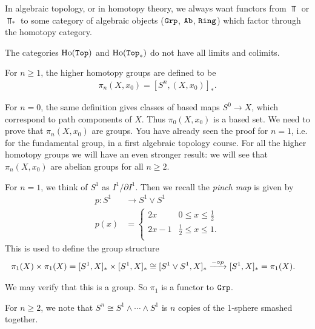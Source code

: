 \documentclass{article}[11pt]
\newcommand{\smashprod}{\wedge} %
\begin{document}
In algebraic topology, or in homotopy theory, we always want functors from $\Top$ or $\Top_\ast$ to some category of algebraic objects ($\texttt{Grp}$, $\texttt{Ab}$, $\texttt{Ring}$) which factor through the homotopy category.

\begin{warn} The categories $\text{Ho}(\texttt{Top})$ and $\text{Ho}(\texttt{Top}_\ast)$ do not have all limits and colimits.
\end{warn}




\begin{definition} For $n\geq 1$, the higher homotopy groups are defined to be
\begin{align*}
	\pi_n(X,x_0) = [S^n, (X,x_0)]_{\ast}.
\end{align*}
\end{definition}

For $n=0$, the same definition gives classes of based maps $S^0 \to X$, which correspond to path components of $X$. Thus $\pi_0(X, x_0)$ is a based set. We need to prove that $\pi_n(X, x_0)$ are groups. You have already seen the proof for $n=1$, i.e. for the fundamental group, in a first algebraic topology course. For all the higher homotopy groups we will have an even stronger result: we will see that $\pi_n(X, x_0)$ are abelian groups for all $n\geq 2$.


For $n=1$, we think of $S^1$ as $I^1 \Big/ \partial I^1$. Then we recall the \textit{pinch map} is given by
	\begin{align*}
		p : S^1 &\to S^1 \vee S^1 \\
		p(x) &= \begin{cases} 2x & 0\leq x \leq \frac{1}{2} \\ 2x-1 & \frac{1}{2} \leq x \leq 1. \\ \end{cases}
	\end{align*}
	This is used to define the group structure
	\begin{align*}
		\pi_1(X)\times \pi_1(X) &= [S^1,X]_\ast \times [S^1,X]_\ast \cong [S^1 \vee S^1, X]_\ast \xrightarrow{-\circ p} [S^1, X]_\ast = \pi_1(X).
	\end{align*}

We may verify that this is a group. So $\pi_1$ is a functor to $\texttt{Grp}$.


For $n\geq 2$, we note that $S^n \cong S^1 \smashprod \cdots \smashprod S^1$ is $n$ copies of the 1-sphere smashed together.
\end{document}
